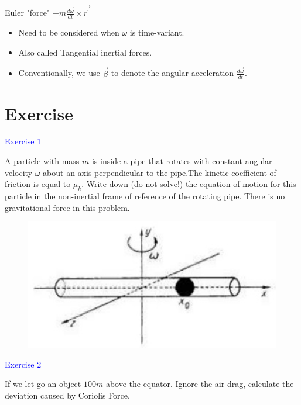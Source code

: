 \documentclass{beamer}
\begin{document}
\begin{frame}{Euler "force" $-m \frac{d \vec{\omega}}{d t} \times \vec{r^{\prime}}$}
  \begin{itemize}
    \item Need to be considered when $\omega$ is time-variant.
    \item Also called Tangential inertial forces.
    \item Conventionally, we use $\vec{\beta}$ to denote the angular acceleration $\frac{d \vec{\omega}}{d t}$.
  \end{itemize}
\end{frame}

\section{Exercise}
\begin{frame}
\textcolor{blue}{Exercise 1}

A particle with mass $m$ is inside a pipe that rotates with constant
angular velocity $\omega$ about an axis perpendicular to the pipe.The
kinetic coefficient of friction is equal to $\mu_k$. Write down (do not
solve!) the equation of motion for this particle in the non-inertial
frame of reference of the rotating pipe. There is no gravitational
force in this problem.
\begin{figure}[htbp]
\centering
\includegraphics[width=0.5 \linewidth, angle =0]{ex1.png}
\label{fig:4}
\end{figure}
\end{frame}

\begin{frame}
\textcolor{blue}{Exercise 2}

If we let go an object $100m$ above the equator. Ignore the air
drag, calculate the deviation caused by Coriolis Force.
\end{frame}
\end{document}
